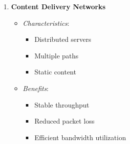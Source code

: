 \documentclass[11pt,a4paper]{article}
\begin{document}
\begin{tcolorbox}[
    enhanced,
    colback=white,
    colframe=green!75!black,
    title=Deployment Scenarios Analysis]
\begin{enumerate}
    \item \textbf{Content Delivery Networks}
    \begin{itemize}
        \item \textit{Characteristics}:
        \begin{itemize}
            \item Distributed servers
            \item Multiple paths
            \item Static content
        \end{itemize}
        \item \textit{Benefits}:
        \begin{itemize}
            \item Stable throughput
            \item Reduced packet loss
            \item Efficient bandwidth utilization
        \end{itemize}
    \end{itemize}
\end{enumerate}
\end{tcolorbox}
\end{document}
